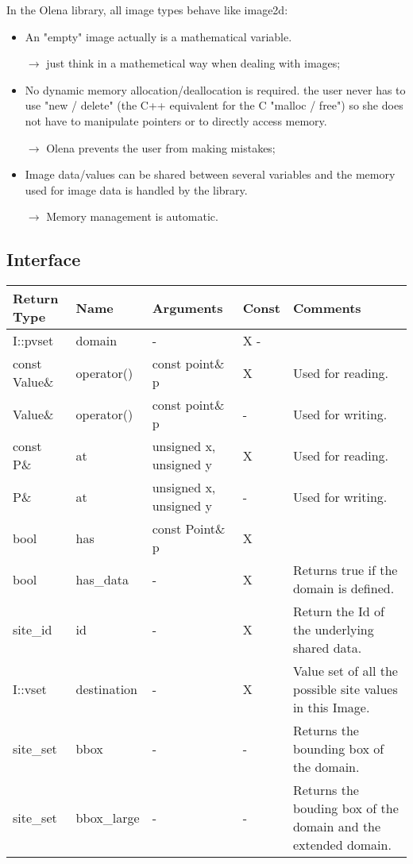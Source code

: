 \documentclass{report}
\begin{document}
In the Olena library, all image types behave like image2d:
\begin{itemize}
\item An "empty" image actually is a mathematical variable.

      $\rightarrow$ just think in a mathemetical way when dealing with images;

\item No dynamic memory allocation/deallocation is required.
    the user never has to use "new / delete" (the C++ equivalent for the C
    "malloc / free") so she does not have to manipulate pointers or to directly
    access memory.
    
    $\rightarrow$ Olena prevents the user from making mistakes;

\item Image data/values can be shared between several variables and the memory
    used for image data is handled by the library.
    
    $\rightarrow$ Memory management is automatic.
\end{itemize}



\subsection{Interface}

\begin{tabular}{|l|l|l|l|p{4cm}|}
\hline
Return Type & Name & Arguments & Const & Comments \\ \hline

I::pvset & domain & - & X - &  \\ \hline
const Value\& & operator() & const point\& p & X & Used for reading. \\ \hline
Value\& & operator() & const point\& p & - & Used for writing. \\ \hline
const P\& & at & unsigned x,
         unsigned y & X & Used for reading. \\ \hline
P\& & at & unsigned x,
         unsigned y & - & Used for writing. \\ \hline
bool & has & const Point\& p & X & \\ \hline
bool & has\_data & - & X & Returns true if the domain is defined. \\ \hline
site\_id & id & - & X & Return the Id of the underlying shared data. \\ \hline
I::vset & destination & - & X & Value set of all the possible site values in this
Image. \\ \hline
site\_set & bbox & - & - & Returns the bounding box of the domain. \\ \hline
site\_set & bbox\_large & - & - & Returns the bouding box of the domain and the
extended domain. \\ \hline

\end{tabular}
\end{document}
